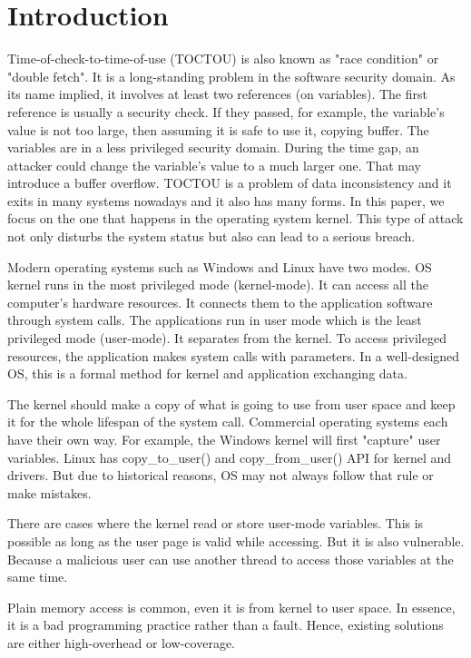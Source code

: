 
\section{Introduction}
\label{sec:introduction}

Time-of-check-to-time-of-use (TOCTOU) is also known as "race condition" or "double fetch". It is a long-standing problem in the software security domain. As its name implied, it involves at least two references (on variables). The first reference is usually a security check.  If they passed, for example, the variable's value is not too large,  then assuming it is safe to use it, copying buffer. The variables are in a less privileged security domain. During the time gap,  an attacker could change the variable's value to a much larger one. That may introduce a buffer overflow. TOCTOU is a problem of data inconsistency and it exits in many systems nowadays and it also has many forms. In this paper, we focus on the one that happens in the operating system kernel. This type of attack not only disturbs the system status but also can lead to a serious breach.

Modern operating systems such as Windows and Linux have two modes. OS kernel runs in the most privileged mode (kernel-mode). It can access all the computer's hardware resources. It connects them to the application software through system calls. The applications run in user mode which is the least privileged mode (user-mode). It separates from the kernel. To access privileged resources, the application makes system calls with parameters. In a well-designed OS, this is a formal method for kernel and application exchanging data.


The kernel should make a copy of what is going to use from user space and keep it for the whole lifespan of the system call.  Commercial operating systems each have their own way. For example, the Windows kernel will first "capture" user variables. Linux has copy\_to\_user() and copy\_from\_user() API for kernel and drivers. But due to historical reasons, OS may not always follow that rule or make mistakes.

There are cases where the kernel read or store user-mode variables. This is possible as long as the user page is valid while accessing. But it is also vulnerable. Because a malicious user can use another thread to access those variables at the same time. 

Plain memory access is common, even it is from kernel to user space. In essence, it is a bad programming practice rather than a fault. Hence, existing solutions are either high-overhead or low-coverage.

